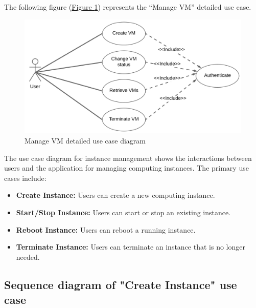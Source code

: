 The following figure (\hyperref[fig:use_case-manage_vm2]{Figure \ref{fig:use_case-manage_vm2}})  represents the ``Manage VM'' detailed use case.
\vspace*{2cm}
\begin{figure}[h]
  \center
  \includegraphics[width=14cm]{./chapters/sprint2/use_case-manage_vm2.png}
  \caption{Manage VM detailed use case diagram}
  \label{fig:use_case-manage_vm2}
\end{figure}
The use case diagram for instance management shows the interactions between users and the application for managing computing instances. The primary use cases include:
\begin{itemize}
  \item \textbf{Create Instance:} Users can create a new computing instance.
  \item \textbf{Start/Stop Instance:} Users can start or stop an existing instance.
  \item \textbf{Reboot Instance:} Users can reboot a running instance.
  \item \textbf{Terminate Instance:} Users can terminate an instance that is no longer needed.
\end{itemize}

\subsection{Sequence diagram of "Create Instance" use case}

